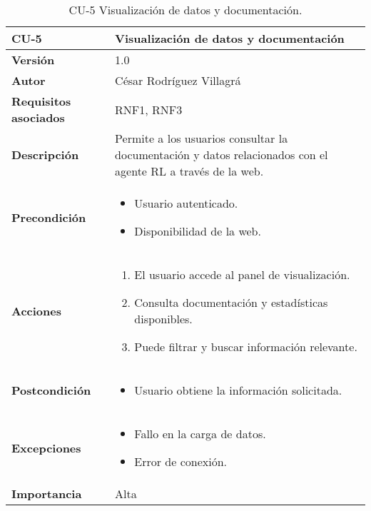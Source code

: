 \begin{table}[p]
	\centering
	\begin{tabularx}{\linewidth}{ p{} p{} }
		\toprule
		\textbf{CU-5}    & \textbf{Visualización de datos y documentación} \\
		\toprule
		\textbf{Versión}              & 1.0    \\
		\textbf{Autor}                & César Rodríguez Villagrá \\
		\textbf{Requisitos asociados} & RNF1, RNF3 \\
		\textbf{Descripción}          & Permite a los usuarios consultar la documentación y datos relacionados con el agente RL a través de la web. \\
		\textbf{Precondición}         & 
		\begin{itemize}
			\item Usuario autenticado.
			\item Disponibilidad de la web.
		\end{itemize} \\
		\textbf{Acciones}             & 
		\begin{enumerate}
			\item El usuario accede al panel de visualización.
			\item Consulta documentación y estadísticas disponibles.
			\item Puede filtrar y buscar información relevante.
		\end{enumerate} \\
		\textbf{Postcondición}        & 
		\begin{itemize}
			\item Usuario obtiene la información solicitada.
		\end{itemize} \\
		\textbf{Excepciones}          & 
		\begin{itemize}
			\item Fallo en la carga de datos.
			\item Error de conexión.
		\end{itemize} \\
		\textbf{Importancia}          & Alta \\
		\bottomrule
	\end{tabularx}
	\caption{CU-5 Visualización de datos y documentación.}
\end{table}
